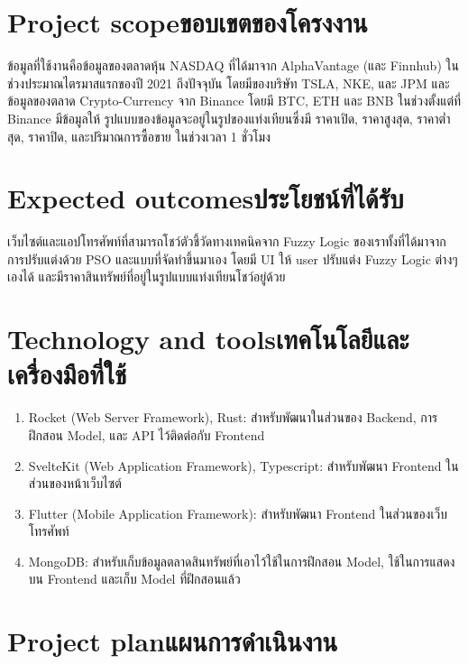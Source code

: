 \section{\ifenglish Project scope\else ขอบเขตของโครงงาน\fi}
ข้อมูลที่ใช้งานคือข้อมูลของตลาดหุ้น NASDAQ ที่ได้มาจาก AlphaVantage (และ Finnhub) ในช่วงประมาณไตรมาสแรกของปี 2021 ถึงปัจจุบัน โดยมีของบริษัท TSLA, NKE, และ JPM 
และข้อมูลของตลาด Crypto-Currency จาก Binance โดยมี BTC, ETH และ BNB ในช่วงตั้งแต่ที่ Binance มีข้อมูลให้ 
รูปแบบของข้อมูลจะอยู่ในรูปของแท่งเทียนซึ่งมี ราคาเปิด, ราคาสูงสุด, ราคาต่ำสุด, ราคาปิด, และปริมาณการซื้อขาย ในช่วงเวลา 1 ชั่วโมง 

\section{\ifenglish Expected outcomes\else ประโยชน์ที่ได้รับ\fi}
เว็บไซต์และแอปโทรศัพท์ที่สามารถโชว์ตัวชี้วัดทางเทคนิคจาก Fuzzy Logic ของเราทั้งที่ได้มาจากการปรับแต่งด้วย PSO และแบบที่จัดทำขึ้นมาเอง 
โดยมี UI ให้ user ปรับแต่ง Fuzzy Logic ต่างๆ เองได้ และมีราคาสินทรัพย์ที่อยู่ในรูปแบบแท่งเทียนโชว์อยู่ด้วย

\section{\ifenglish Technology and tools\else เทคโนโลยีและเครื่องมือที่ใช้\fi}
\begin{enumerate}
    \item Rocket (Web Server Framework), Rust: สำหรับพัฒนาในส่วนของ Backend, การฝึกสอน Model, และ API ไว้ติดต่อกับ Frontend
    \item SvelteKit (Web Application Framework), Typescript: สำหรับพัฒนา Frontend ในส่วนของหน้าเว็บไซต์
    \item Flutter (Mobile Application Framework): สำหรับพัฒนา Frontend ในส่วนของเว็บโทรศัพท์
    \item MongoDB: สำหรับเก็บข้อมูลตลาดสินทรัพย์ที่เอาไว้ใช้ในการฝึกสอน Model, ใช้ในการแสดงบน Frontend และเก็บ Model ที่ฝึกสอนแล้ว
\end{enumerate}

\section{\ifenglish Project plan\else แผนการดำเนินงาน\fi}



